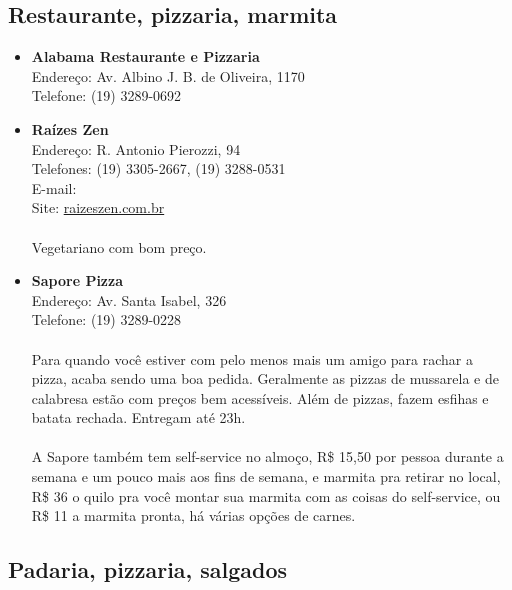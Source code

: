\subsection{Restaurante, pizzaria, marmita}

\begin{itemize}
\item \textbf{Alabama Restaurante e Pizzaria}
  \\Endereço: Av. Albino J. B. de Oliveira, 1170
  \\Telefone: (19) 3289-0692

\item \textbf{Raízes Zen}
  \\Endereço: R. Antonio Pierozzi, 94
  \\Telefones: (19) 3305-2667, (19) 3288-0531
  \\E-mail: 
  \\Site: \url{raizeszen.com.br}
  \\
  \\Vegetariano com bom preço.

\item \textbf{Sapore Pizza}
  \\Endereço: Av. Santa Isabel, 326
  \\Telefone: (19) 3289-0228
  \\
  \\Para quando você estiver com pelo menos mais um amigo para rachar a pizza,
  acaba sendo uma boa pedida. Geralmente as pizzas de mussarela e de calabresa
  estão com preços bem acessíveis. Além de pizzas, fazem esfihas e batata
  rechada. Entregam até 23h.
  \\
  \\A Sapore também tem self-service no almoço, R\$ 15,50 por pessoa durante a
  semana e um pouco mais aos fins de semana, e marmita pra retirar no local,
  R\$ 36 o quilo pra você montar sua marmita com as coisas do self-service, ou
  R\$ 11 a marmita pronta, há várias opções de carnes.
\end{itemize}

\subsection{Padaria, pizzaria, salgados}

